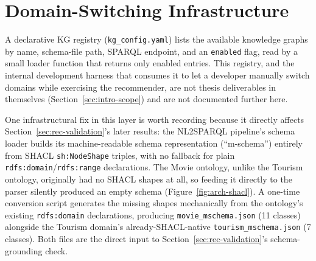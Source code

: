 \documentclass[11pt,a4paper,oneside]{book}
\newcommand{\code}[1]{\texttt{#1}}
\begin{document}
\section{Domain-Switching Infrastructure}
\label{sec:arch-domain}

A declarative KG registry (\code{kg\_config.yaml}) lists the available knowledge graphs by name,
schema-file path, SPARQL endpoint, and an \code{enabled} flag, read by a small loader function that
returns only enabled entries. This registry, and the internal development harness that consumes it
to let a developer manually switch domains while exercising the recommender, are not thesis
deliverables in themselves (Section~\ref{sec:intro-scope}) and are not documented further here.

One infrastructural fix in this layer is worth recording because it directly affects
Section~\ref{sec:rec-validation}'s later results: the NL2SPARQL pipeline's schema loader builds its
machine-readable schema representation (``m-schema'') entirely from SHACL \code{sh:NodeShape}
triples, with no fallback for plain \code{rdfs:domain}/\code{rdfs:range} declarations. The Movie
ontology, unlike the Tourism ontology, originally had no SHACL shapes at all, so feeding it directly
to the parser silently produced an empty schema (Figure~\ref{fig:arch-shacl}). A one-time conversion
script generates the missing shapes mechanically from the ontology's existing \code{rdfs:domain}
declarations, producing \code{movie\_mschema.json} (11 classes) alongside the Tourism domain's
already-SHACL-native \code{tourism\_mschema.json} (7 classes). Both files are the direct input to
Section~\ref{sec:rec-validation}'s schema-grounding check.
\end{document}
